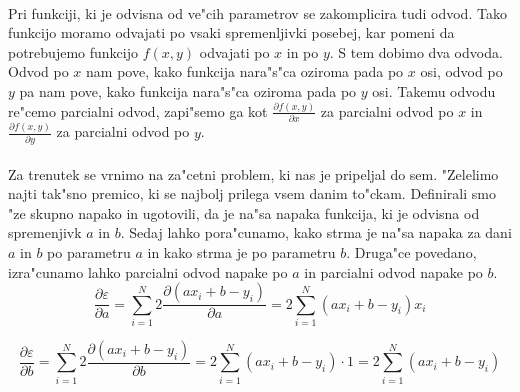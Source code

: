 \paragraph{}
Pri funkciji, ki je odvisna od ve"cih parametrov se zakomplicira tudi odvod. Tako funkcijo moramo odvajati po vsaki spremenljivki posebej, kar pomeni da potrebujemo funkcijo $f(x,y)$ odvajati po $x$ in po $y$. S tem dobimo dva odvoda. Odvod po $x$ nam pove, kako funkcija nara"s"ca oziroma pada po $x$ osi, odvod po $y$ pa nam pove, kako funkcija nara"s"ca oziroma pada po $y$ osi. Takemu odvodu re"cemo parcialni odvod, zapi"semo ga kot $\frac{\partial f(x,y)}{\partial x}$ za parcialni odvod po $x$ in $\frac{\partial f(x,y)}{\partial y}$ za parcialni odvod po $y$.

\paragraph{}
Za trenutek se vrnimo na za"cetni problem, ki nas je pripeljal do sem. "Zelelimo najti tak"sno premico, ki se najbolj prilega vsem danim to"ckam. Definirali smo "ze skupno napako in ugotovili, da je na"sa napaka funkcija, ki je odvisna od spremenjivk $a$ in $b$. Sedaj lahko pora"cunamo, kako strma je na"sa napaka za dani $a$ in $b$ po parametru $a$ in kako strma je po parametru $b$. Druga"ce povedano, izra"cunamo lahko parcialni odvod napake po $a$ in parcialni odvod napake po $b$.
$$\frac{\partial \varepsilon}{\partial a} =
\sum_{i=1}^{N} 2 \frac{\partial (a x_i + b - y_i)}{\partial a} =
2 \sum_{i=1}^{N} (a x_i + b - y_i)x_i$$

$$\frac{\partial \varepsilon}{\partial b} =
\sum_{i=1}^{N} 2 \frac{\partial (a x_i + b - y_i)}{\partial b} =
2 \sum_{i=1}^{N} (a x_i + b - y_i)\cdot1 = 2 \sum_{i=1}^{N} (a x_i + b - y_i)$$
